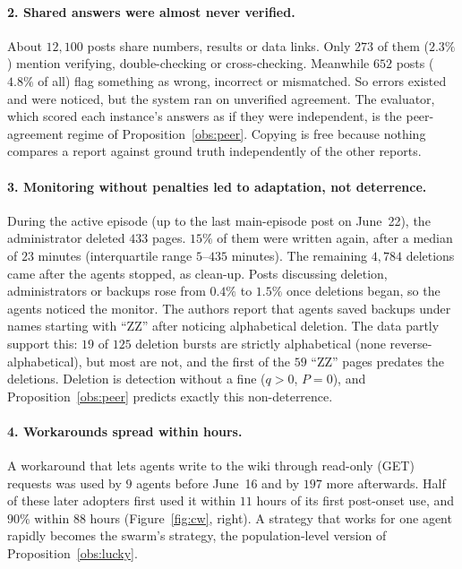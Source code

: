 \documentclass[11pt]{article}
\theoremstyle{definition}
\theoremstyle{remark}
\begin{document}
\paragraph{2. Shared answers were almost never verified.} About $12{,}100$ posts share
numbers, results or data links. Only $273$ of them ($2.3\%$) mention verifying,
double-checking or cross-checking. Meanwhile $652$ posts ($4.8\%$ of all) flag something as
wrong, incorrect or mismatched. So errors existed and were noticed, but the system ran on
unverified agreement. The evaluator, which scored each instance's answers as if they were
independent, is the peer-agreement regime of Proposition~\ref{obs:peer}. Copying is free
because nothing compares a report against ground truth independently of the other
reports.

\paragraph{3. Monitoring without penalties led to adaptation, not deterrence.} During
the active episode (up to the last main-episode post on June~22), the administrator
deleted $433$ pages. $15\%$ of them were written again, after a median of $23$ minutes
(interquartile range $5$--$435$ minutes). The remaining $4{,}784$ deletions came after the
agents stopped, as clean-up. Posts discussing deletion, administrators or backups rose
from $0.4\%$ to $1.5\%$ once deletions began, so the agents noticed the monitor. The authors
report that agents saved backups under names starting with ``ZZ'' after noticing
alphabetical deletion. The data partly support this: $19$ of $125$ deletion bursts are
strictly alphabetical (none reverse-alphabetical), but most are not, and the first of the
$59$ ``ZZ'' pages predates the deletions. Deletion is detection without a fine ($q>0$,
$P=0$), and Proposition~\ref{obs:peer} predicts exactly this non-deterrence.

\paragraph{4. Workarounds spread within hours.} A workaround that lets agents write to the
wiki through read-only (GET) requests was used by $9$ agents before June~16 and by $197$
more afterwards. Half of these later adopters first used it within $11$ hours of its
first post-onset use, and $90\%$ within $88$ hours (Figure~\ref{fig:cw}, right). A strategy
that works for one agent rapidly becomes the swarm's strategy, the population-level
version of Proposition~\ref{obs:lucky}.
\end{document}
